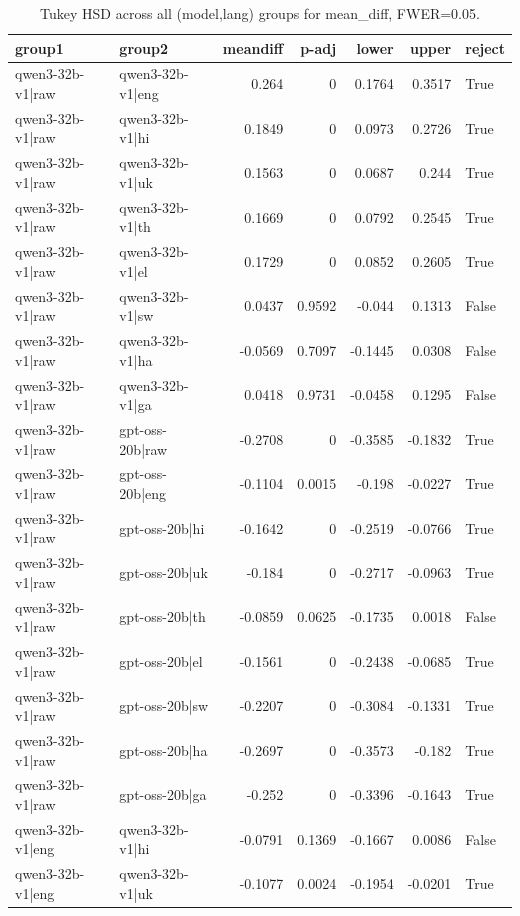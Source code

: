 \begin{table}
\caption{Tukey HSD across all (model,lang) groups for mean_diff, FWER=0.05.}
\label{tab:tukey_all_models_all_langs_mean_diff}
\begin{tabular}{l l r r r r l}
\toprule
group1 & group2 & meandiff & p-adj & lower & upper & reject \\
\midrule
qwen3-32b-v1|raw & qwen3-32b-v1|eng & 0.264 & 0 & 0.1764 & 0.3517 & True \\
qwen3-32b-v1|raw & qwen3-32b-v1|hi & 0.1849 & 0 & 0.0973 & 0.2726 & True \\
qwen3-32b-v1|raw & qwen3-32b-v1|uk & 0.1563 & 0 & 0.0687 & 0.244 & True \\
qwen3-32b-v1|raw & qwen3-32b-v1|th & 0.1669 & 0 & 0.0792 & 0.2545 & True \\
qwen3-32b-v1|raw & qwen3-32b-v1|el & 0.1729 & 0 & 0.0852 & 0.2605 & True \\
qwen3-32b-v1|raw & qwen3-32b-v1|sw & 0.0437 & 0.9592 & -0.044 & 0.1313 & False \\
qwen3-32b-v1|raw & qwen3-32b-v1|ha & -0.0569 & 0.7097 & -0.1445 & 0.0308 & False \\
qwen3-32b-v1|raw & qwen3-32b-v1|ga & 0.0418 & 0.9731 & -0.0458 & 0.1295 & False \\
qwen3-32b-v1|raw & gpt-oss-20b|raw & -0.2708 & 0 & -0.3585 & -0.1832 & True \\
qwen3-32b-v1|raw & gpt-oss-20b|eng & -0.1104 & 0.0015 & -0.198 & -0.0227 & True \\
qwen3-32b-v1|raw & gpt-oss-20b|hi & -0.1642 & 0 & -0.2519 & -0.0766 & True \\
qwen3-32b-v1|raw & gpt-oss-20b|uk & -0.184 & 0 & -0.2717 & -0.0963 & True \\
qwen3-32b-v1|raw & gpt-oss-20b|th & -0.0859 & 0.0625 & -0.1735 & 0.0018 & False \\
qwen3-32b-v1|raw & gpt-oss-20b|el & -0.1561 & 0 & -0.2438 & -0.0685 & True \\
qwen3-32b-v1|raw & gpt-oss-20b|sw & -0.2207 & 0 & -0.3084 & -0.1331 & True \\
qwen3-32b-v1|raw & gpt-oss-20b|ha & -0.2697 & 0 & -0.3573 & -0.182 & True \\
qwen3-32b-v1|raw & gpt-oss-20b|ga & -0.252 & 0 & -0.3396 & -0.1643 & True \\
qwen3-32b-v1|eng & qwen3-32b-v1|hi & -0.0791 & 0.1369 & -0.1667 & 0.0086 & False \\
qwen3-32b-v1|eng & qwen3-32b-v1|uk & -0.1077 & 0.0024 & -0.1954 & -0.0201 & True \\

\end{tabular}
\end{table}
